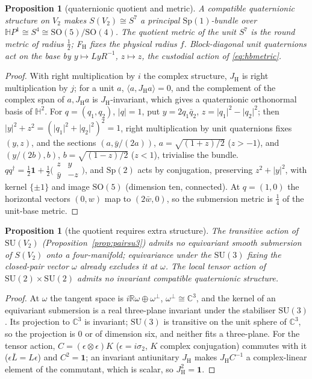 \documentclass[aps,pra,onecolumn,superscriptaddress,nofootinbib,10pt]{revtex4-2}
\newtheorem{proposition}[theorem]{Proposition}
\theoremstyle{definition}
\theoremstyle{remark}
\newcommand{\R}{\mathbb{R}}
\newcommand{\C}{\mathbb{C}}
\newcommand{\HH}{\mathbb{H}}
\newcommand{\ip}[2]{\langle #1,#2\rangle}
\newcommand{\SU}{\mathrm{SU}}
\newcommand{\SO}{\mathrm{SO}}
\begin{document}
\begin{proposition}[quaternionic quotient and metric]\label{prop:hbhopf}
A compatible quaternionic structure on $V_2$ makes $S(V_2)\cong S^7$ a principal $\mathrm{Sp}(1)$-bundle over $\HH P^1\cong S^4\cong\SO(5)/\SO(4)$.  The
quotient metric of the unit $S^7$ is the round metric of radius $\tfrac12$; F$_{\mathrm H}$ fixes the physical radius $f$.
Block-diagonal unit quaternions act on the base by $y\mapsto LyR^{-1}$, $z\mapsto z$, the custodial action of \eqref{eq:hbmetric}.
\end{proposition}
\begin{proof}
With right multiplication by $i$ the complex structure, $J_{\mathrm H}$ is right multiplication by $j$; for a unit $a$,
$\ip a{J_{\mathrm H}a}=0$, and the complement of the complex span of $a,J_{\mathrm H}a$ is $J_{\mathrm H}$-invariant, which gives a quaternionic
orthonormal basis of $\HH^2$.  For $q=(q_1,q_2)$, $\lvert q\rvert=1$, put $y=2q_1\bar q_2$, $z=\lvert q_1\rvert^2-\lvert q_2\rvert^2$; then $\lvert y\rvert^2+z^2=(\lvert q_1\rvert^2+\lvert q_2\rvert^2)^2=1$,
right multiplication by unit quaternions fixes $(y,z)$, and the sections $(a,\bar y/(2a))$, $a=\sqrt{(1+z)/2}$ ($z>-1$), and
$(y/(2b),b)$, $b=\sqrt{(1-z)/2}$ ($z<1$), trivialise the bundle.  $qq^\dagger=\tfrac12\mathbf1+\tfrac12\bigl(\begin{smallmatrix}z&y\\ \bar y&-z\end{smallmatrix}\bigr)$, and $\mathrm{Sp}(2)$ acts by
conjugation, preserving $z^2+\lvert y\rvert^2$, with kernel $\{\pm1\}$ and image $\SO(5)$ (dimension ten, connected).  At $q=(1,0)$ the
horizontal vectors $(0,w)$ map to $(2\bar w,0)$, so the submersion metric is $\tfrac14$ of the unit-base metric.
\end{proof}

\begin{proposition}[the quotient requires extra structure]\label{prop:hbobstruction}
The transitive action of $\SU(V_2)$ (Proposition~\ref{prop:pairsu3}) admits no equivariant smooth submersion of $S(V_2)$
onto a four-manifold; equivariance under the $\SU(3)$ fixing the closed-pair vector $\omega$ already excludes it
at $\omega$.  The local tensor action of $\SU(2)\times\SU(2)$ admits no invariant compatible quaternionic structure.
\end{proposition}
\begin{proof}
At $\omega$ the tangent space is $i\R\omega\oplus\omega^\perp$, $\omega^\perp\cong\C^3$, and the kernel of an equivariant submersion is a real
three-plane invariant under the stabiliser $\SU(3)$.  Its projection to $\C^3$ is invariant; $\SU(3)$ is transitive on the
unit sphere of $\C^3$, so the projection is $0$ or of dimension six, and neither fits a three-plane.  For the
tensor action, $C=(\epsilon\otimes\epsilon)K$ ($\epsilon=i\sigma_2$, $K$ complex conjugation) commutes with it ($\epsilon\bar L=L\epsilon$) and $C^2=\mathbf1$; an
invariant antiunitary $J_{\mathrm H}$ makes $J_{\mathrm H}C^{-1}$ a complex-linear element of the commutant, which is scalar, so $J_{\mathrm H}^2=\mathbf1$.
\end{proof}
\end{document}
